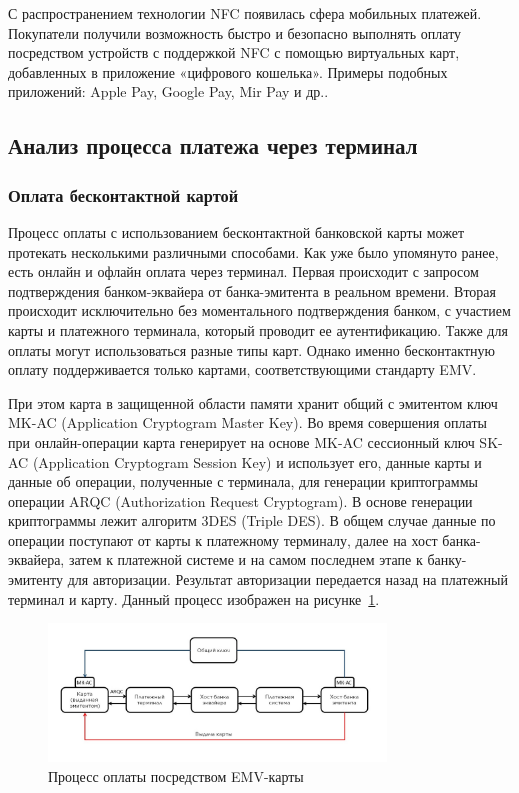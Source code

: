 С распространением технологии NFC появилась сфера мобильных платежей.
Покупатели получили возможность быстро и безопасно выполнять оплату посредством устройств с поддержкой NFC с помощью виртуальных карт, добавленных в приложение «цифрового кошелька».
Примеры подобных приложений: Apple Pay, Google Pay, Mir Pay и др..



\subsection{Анализ процесса платежа через терминал}
\label{subsec:payment_process}

\subsubsection{Оплата бесконтактной картой}
\label{subsubsec:contactless_payment}

Процесс оплаты с использованием бесконтактной банковской карты может протекать несколькими различными способами.
Как уже было упомянуто ранее, есть онлайн и офлайн оплата через терминал.
Первая происходит с запросом подтверждения банком-эквайера от банка-эмитента в реальном времени.
Вторая происходит исключительно без моментального подтверждения банком, с участием карты и платежного терминала, который проводит ее аутентификацию.
Также для оплаты могут использоваться разные типы карт.
Однако именно бесконтактную оплату поддерживается только картами, соответствующими стандарту EMV.

При этом карта в защищенной области памяти хранит общий с эмитентом ключ MK-AC (Application Cryptogram Master Key).
Во время совершения оплаты при онлайн-операции карта генерирует на основе MK-AC сессионный ключ SK-AC (Application Cryptogram Session Key) и использует его, данные карты и данные об операции, полученные с терминала, для генерации криптограммы операции ARQC (Authorization Request Cryptogram).
В основе генерации криптограммы лежит алгоритм 3DES (Triple DES).
В общем случае данные по операции поступают от карты к платежному терминалу, далее на хост банка-эквайера, затем к платежной системе и на самом последнем этапе к банку-эмитенту для авторизации.
Результат авторизации передается назад на платежный терминал и карту.
Данный процесс изображен на рисунке~\ref{fig:emv_card_payment}.

\begin{figure}[H]
    \centering
    \includegraphics[width=0.8\textwidth]{images/research/emv_card_payment}
    \caption{\centering Процесс оплаты посредством EMV-карты}
    \label{fig:emv_card_payment}
\end{figure}

